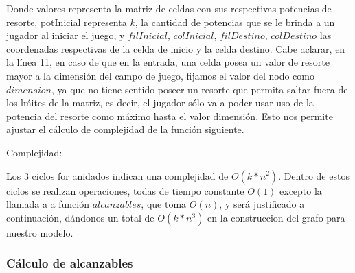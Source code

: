 Donde valores representa la matriz de celdas con sus respectivas potencias de resorte, potInicial representa $k$, la cantidad de potencias que se le brinda a un jugador al iniciar el juego, y $filInicial$, $colInicial$, $filDestino$, $colDestino$ las coordenadas respectivas de la celda de inicio y la celda destino. Cabe aclarar, en la l\'inea 11, en caso de que en la entrada, una celda posea un valor de resorte mayor a la dimensi\'on del campo de juego, fijamos el valor del nodo como $dimension$, ya que no tiene sentido poseer un resorte que permita saltar fuera de los l\'mites de la matriz, es decir, el jugador s\'olo va a poder usar uso de la potencia del resorte como m\'aximo hasta el valor dimensi\'on. Esto nos permite ajustar el c\'alculo de complejidad de la funci\'on siguiente.

\vspace{2mm}

Complejidad:

Los 3 ciclos for anidados indican una complejidad de $O(k*n^2)$. Dentro de estos ciclos se realizan operaciones, todas de tiempo constante $O(1)$ excepto la llamada a a funci\'on $alcanzables$, que toma $O(n)$, y ser\'a justificado a continuaci\'on, d\'andonos un total de $O(k*n^3)$ en la construccion del grafo para nuestro modelo.

\vspace{10mm}		

 \subsubsection{C\'alculo de alcanzables}

